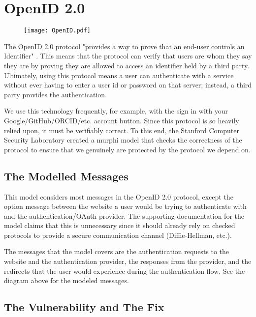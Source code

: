 \documentclass{article}
\begin{document}
\clearpage

\section{OpenID 2.0}

\begin{figure}[htbp]
  \centering
  \texttt{[image: OpenID.pdf]}
\end{figure}

The OpenID 2.0 protocol "provides a way to prove that an end-user controls an Identifier" \cite{lingamneni_newman}. This means that the protocol can verify that users are whom they say they are by proving they are allowed to access an identifier held by a third party. Ultimately, using this protocol means a user can authenticate with a service without ever having to enter a user id or password on that server; instead, a third party provides the authentication.

We use this technology frequently, for example, with the sign in with your Google/GitHub/ORCID/etc. account button. Since this protocol is so heavily relied upon, it must be verifiably correct. To this end, the Stanford Computer Security Laboratory created a murphi model that checks the correctness of the protocol to ensure that we genuinely are protected by the protocol we depend on.

\subsection{The Modelled Messages}

This model considers most messages in the OpenID 2.0 protocol, except the option message between the website a user would be trying to authenticate with and the authentication/OAuth provider. The supporting documentation for the model claims that this is unnecessary since it should already rely on checked protocols to provide a secure communication channel (Diffie-Hellman, etc.).

The messages that the model covers are the authentication requests to the website and the authentication provider, the responses from the provider, and the redirects that the user would experience during the authentication flow. See the diagram above for the modeled messages.

\subsection{The Vulnerability and The Fix}
\end{document}
